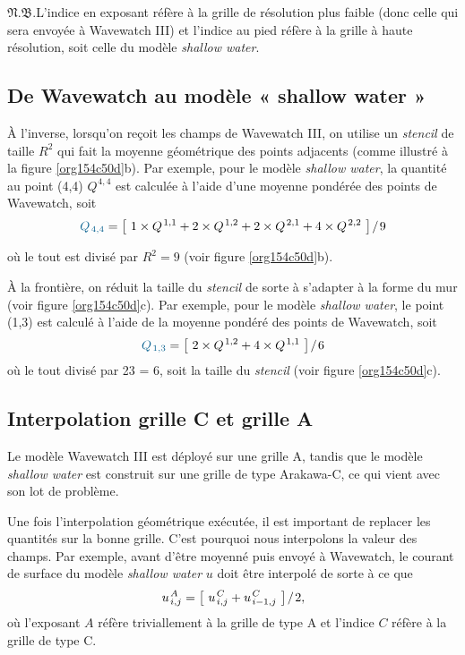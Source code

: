\documentclass[10pt]{report}
\numberwithin{equation}{section}
\newcommand{\pt}{\hspace{1pt}} %
\newcommand{\nb}{\underline{{\footnotesize\EightStarConvex}\pt $\mathfrak{N.B.}$\vphantom{p}}\hspace{3pt}}
\begin{document}
\nb L'indice en exposant réfère à la grille de résolution plus faible (donc celle qui sera envoyée à Wavewatch III) et l'indice au pied réfère à la grille à haute résolution, soit celle du modèle \emph{shallow water}.

\subsection{De Wavewatch au modèle « shallow water »}
\label{sec:org80de19b}

À l'inverse, lorsqu'on reçoit les champs de Wavewatch III,  on utilise un \emph{stencil} de taille \(R^2\) qui fait la moyenne géométrique des points adjacents (comme illustré à la figure \ref{org154c50d}b).
Par exemple, pour le modèle \emph{shallow water}, la quantité au point (4,4) \(Q^{\pt4,4}\) est calculée à l'aide d'une moyenne pondérée des points de Wavewatch, soit
\begin{equation}
   {\color{MidnightBlue} Q_{\pt4,4}} = \qty[\ 1\times Q^{\pt1,1}+ 2\times Q^{\pt1,2}+ 2\times Q^{\pt2,1}+ 4\times Q^{\pt2,2}\ ]\pt/\pt9
\end{equation}

où le tout est divisé par \(R^2 = 9\) (voir figure \ref{org154c50d}b).\bigskip

À la frontière, on réduit la taille du \emph{stencil} de sorte à s'adapter à la forme du mur (voir figure \ref{org154c50d}c).
Par exemple, pour le modèle \emph{shallow water}, le point (1,3) est calculé à l'aide de la moyenne pondéré des points de Wavewatch, soit
\begin{equation}
\label{eq:org0942f24}
   {\color{MidnightBlue} Q_{\pt1,3}} = \qty[\ 2\times Q^{\pt1,2} + 4\times Q^{\pt1,1}\ ]\pt/\pt6
\end{equation}
où le tout divisé par 2\texttimes{}3 = 6, soit la taille du \emph{stencil} (voir figure \ref{org154c50d}c).

\subsection{Interpolation grille C et grille A}
\label{sec:org441b5f1}

Le modèle Wavewatch III est déployé sur une grille A, tandis que le modèle \emph{shallow water} est construit sur une grille de type Arakawa-C, ce qui vient avec son lot de problème.\bigskip

Une fois l'interpolation géométrique exécutée, il est important de replacer les quantités sur la bonne grille.
C'est pourquoi nous interpolons la valeur des champs.
Par exemple, avant d'être moyenné puis envoyé à Wavewatch, le courant de surface du modèle \emph{shallow water} \(u\) doit être interpolé de sorte à ce que
\begin{equation}
\label{eq:org8910cf3}
   u^{\pt A}_{\pt i,j} = \qty[\ u^{\pt C}_{\pt i,j} + u^{\pt C}_{\pt i-1,j}\ ]\pt/\pt2,
\end{equation}
où l'exposant \(A\) réfère triviallement à la grille de type A et l'indice \(C\) réfère à la grille de type C.\bigskip
\end{document}
